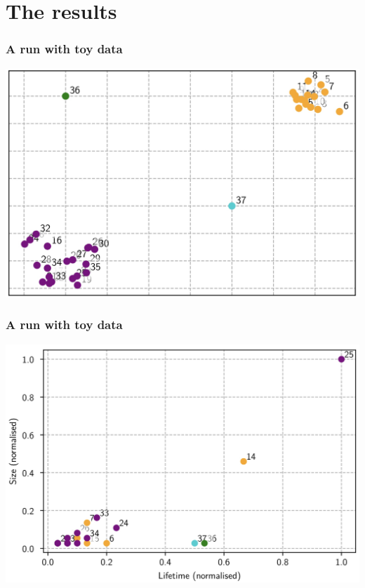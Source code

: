 \documentclass{beamer}
\begin{document}
\section{The results}
\begin{frame}
	\frametitle{A run with toy data}
	\centering
	\includegraphics[width=\textwidth]{beamer/clusters}
\end{frame}

\begin{frame}
	\frametitle{A run with toy data}
	\centering
	\includegraphics[width=\textwidth]{beamer/toy-results}
\end{frame}
\end{document}
